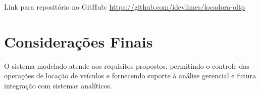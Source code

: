 \documentclass[12pt,a4paper]{article}
\begin{document}
Link para reposit\'orio no GitHub:
\url{https://github.com/idevlimes/locadora-oltp}

\section{Considera\c{c}\~{o}es Finais}

O sistema modelado atende aos requisitos propostos, permitindo o controle das opera\c{c}\~oes de loca\c{c}\~ao de ve\'iculos e fornecendo suporte \`a an\'alise gerencial e futura integra\c{c}\~ao com sistemas anal\'iticos.
\end{document}
